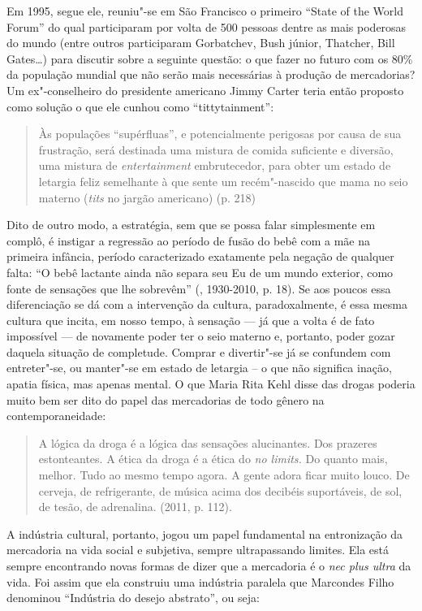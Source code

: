 {Em 1995, segue ele, reuniu"-se em São Francisco o primeiro ``State of the
World Forum'' do qual participaram por volta de 500 pessoas dentre as
mais poderosas do mundo (entre outros participaram Gorbatchev, Bush
júnior, Thatcher, Bill Gates\ldots{}) para discutir sobre a seguinte questão:
o que fazer no futuro com os 80\% da população mundial que não serão
mais necessárias à produção de mercadorias? Um ex"-conselheiro do
presidente americano Jimmy Carter teria então proposto como solução o
que ele cunhou como ``tittytainment'':

\begin{quote}
Às populações ``supérfluas'', e potencialmente perigosas por causa de
sua frustração, será destinada uma mistura de comida suficiente e
diversão, uma mistura de \emph{entertainment} embrutecedor, para obter
um estado de letargia feliz semelhante à que sente um recém"-nascido que
mama no seio materno (\emph{tits} no jargão americano) (p. 218)
\end{quote}

Dito de outro modo, a estratégia, sem que se possa falar simplesmente em
complô, é instigar a regressão ao período de fusão do bebê com a mãe na
primeira infância, período caracterizado exatamente pela negação de
qualquer falta: ``O bebê lactante ainda não separa seu Eu de um mundo
exterior, como fonte de sensações que lhe sobrevêm'' (, 1930-2010,
p. 18). Se aos poucos essa diferenciação se dá com a intervenção da
cultura, paradoxalmente, é essa mesma cultura que incita, em nosso
tempo, à sensação --- já que a volta é de fato impossível --- de
novamente poder ter o seio materno e, portanto, poder gozar daquela
situação de completude. Comprar e divertir"-se já se confundem com
entreter"-se, ou manter"-se em estado de letargia -- o que não significa
inação, apatia física, mas apenas mental. O que Maria Rita Kehl disse
das drogas poderia muito bem ser dito do papel das mercadorias de todo
gênero na contemporaneidade:

\begin{quote}
A lógica da droga é a lógica das sensações alucinantes. Dos prazeres
estonteantes. A ética da droga é a ética do \emph{no limits.} Do quanto
mais, melhor. Tudo ao mesmo tempo agora. A gente adora ficar muito
louco. De cerveja, de refrigerante, de música acima dos decibéis
suportáveis, de sol, de tesão, de adrenalina. (2011, p. 112).
\end{quote}

A indústria cultural, portanto, jogou um papel fundamental na
entronização da mercadoria na vida social e subjetiva, sempre
ultrapassando limites. Ela está sempre encontrando novas formas de dizer
que a mercadoria é o \emph{nec plus ultra} da vida. Foi assim que ela
construiu uma indústria paralela que Marcondes Filho denominou
``Indústria do desejo abstrato'', ou seja:

}
